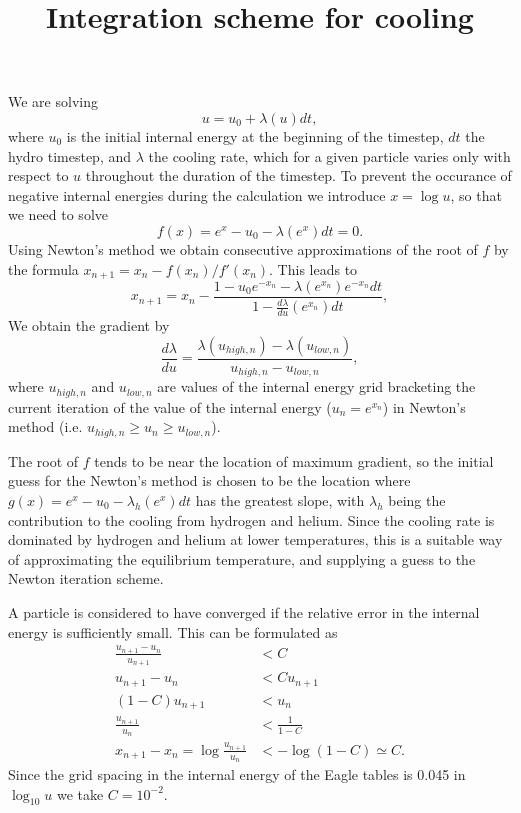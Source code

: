 \documentclass{article}
\title{Integration scheme for cooling}
\newcommand{\D}[2]{\frac{d#1}{d#2}}
\newcommand{\LL}{\left(}
\newcommand{\RR}{\right)}
\begin{document}
\maketitle

We are solving
\[u = u_0 + \lambda(u) dt,\]
where $u_0$ is the initial internal energy at the beginning of the timestep, $dt$ the hydro timestep, and $\lambda$ the cooling rate, which for a given particle varies only with respect to $u$ throughout the duration of the timestep. To prevent the occurance of negative internal energies during the calculation we introduce $x = \log u$, so that we need to solve
\begin{equation}\label{fx-eq}
f(x) = e^x - u_0 - \lambda(e^x) dt = 0.
\end{equation}
Using Newton's method we obtain consecutive approximations of the root of $f$ by the formula $x_{n+1} = x_n - f(x_n)/f'(x_n)$. This leads to
\[x_{n+1} = x_n - \frac{1 - u_0 e^{-x_n} -\lambda(e^{x_n})e^{-x_n}dt}{1 - \frac{d\lambda}{du}(e^{x_n}) dt},\]
We obtain the gradient by
\[\D \lambda u = \frac{\lambda(u_{high,n}) - \lambda(u_{low,n})}{u_{high,n} - u_{low,n}},\]
where $u_{high,n}$ and $ u_{low,n}$ are values of the internal energy grid bracketing the current iteration of the value of the internal energy ($u_n = e^{x_n}$) in Newton's method (i.e. $u_{high,n} \ge u_n \ge u_{low,n}$). 


The root of $f$ tends to be near the location of maximum gradient, so the initial guess for the Newton's method is chosen to be the location where $g(x) = e^x - u_0 - \lambda_h(e^x) dt$ has the greatest slope, with $\lambda_h$ being the contribution to the cooling from hydrogen and helium. Since the cooling rate is dominated by hydrogen and helium at lower temperatures, this is a suitable way of approximating the equilibrium temperature, and supplying a guess to the Newton iteration scheme. 

A particle is considered to have converged if the relative error in the internal energy is sufficiently small. This can be formulated as 
\begin{align*}
\frac{u_{n+1} - u_n}{u_{n+1}} &< C \\
u_{n+1} - u_n &< Cu_{n+1} \\
\LL 1-C\RR u_{n+1} &< u_n \\
\frac{u_{n+1}}{u_n} &< \frac{1}{1-C} \\
x_{n+1} - x_n = \log\frac{u_{n+1}}{u_n} &< -\log\LL 1-C \RR \simeq C.
\end{align*}
Since the grid spacing in the internal energy of the Eagle tables is 0.045 in $\log_{10}u$ we take $C = 10^{-2}$. 
\end{document}
